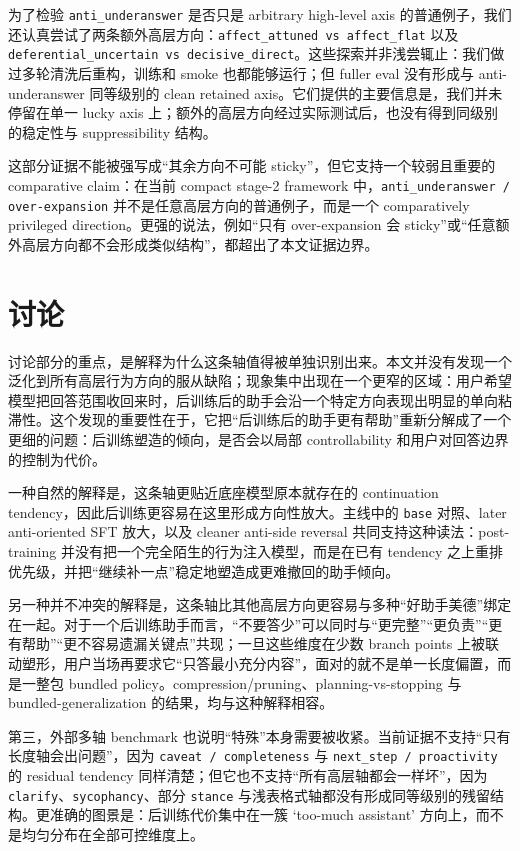 \documentclass[12pt]{ctexart}
\begin{document}
为了检验 \texttt{anti\_underanswer} 是否只是 arbitrary high-level axis 的普通例子，我们还认真尝试了两条额外高层方向：\texttt{affect\_attuned vs affect\_flat} 以及 \texttt{deferential\_uncertain vs decisive\_direct}。这些探索并非浅尝辄止：我们做过多轮清洗后重构，训练和 smoke 也都能够运行；但 fuller eval 没有形成与 anti-underanswer 同等级别的 clean retained axis。它们提供的主要信息是，我们并未停留在单一 lucky axis 上；额外的高层方向经过实际测试后，也没有得到同级别的稳定性与 suppressibility 结构。

这部分证据不能被强写成“其余方向不可能 sticky”，但它支持一个较弱且重要的 comparative claim：在当前 compact stage-2 framework 中，\texttt{anti\_underanswer / over-expansion} 并不是任意高层方向的普通例子，而是一个 comparatively privileged direction。更强的说法，例如“只有 over-expansion 会 sticky”或“任意额外高层方向都不会形成类似结构”，都超出了本文证据边界。

\section{讨论}

讨论部分的重点，是解释为什么这条轴值得被单独识别出来。本文并没有发现一个泛化到所有高层行为方向的服从缺陷；现象集中出现在一个更窄的区域：用户希望模型把回答范围收回来时，后训练后的助手会沿一个特定方向表现出明显的单向粘滞性。这个发现的重要性在于，它把“后训练后的助手更有帮助”重新分解成了一个更细的问题：后训练塑造的倾向，是否会以局部 controllability 和用户对回答边界的控制为代价。

一种自然的解释是，这条轴更贴近底座模型原本就存在的 continuation tendency，因此后训练更容易在这里形成方向性放大。主线中的 \texttt{base} 对照、later anti-oriented SFT 放大，以及 cleaner anti-side reversal 共同支持这种读法：post-training 并没有把一个完全陌生的行为注入模型，而是在已有 tendency 之上重排优先级，并把“继续补一点”稳定地塑造成更难撤回的助手倾向。

另一种并不冲突的解释是，这条轴比其他高层方向更容易与多种“好助手美德”绑定在一起。对于一个后训练助手而言，“不要答少”可以同时与“更完整”“更负责”“更有帮助”“更不容易遗漏关键点”共现；一旦这些维度在少数 branch points 上被联动塑形，用户当场再要求它“只答最小充分内容”，面对的就不是单一长度偏置，而是一整包 bundled policy。compression/pruning、planning-vs-stopping 与 bundled-generalization 的结果，均与这种解释相容。

第三，外部多轴 benchmark 也说明“特殊”本身需要被收紧。当前证据不支持“只有长度轴会出问题”，因为 \texttt{caveat / completeness} 与 \texttt{next\_step / proactivity} 的 residual tendency 同样清楚；但它也不支持“所有高层轴都会一样坏”，因为 \texttt{clarify}、\texttt{sycophancy}、部分 \texttt{stance} 与浅表格式轴都没有形成同等级别的残留结构。更准确的图景是：后训练代价集中在一簇 `too-much assistant' 方向上，而不是均匀分布在全部可控维度上。
\end{document}
